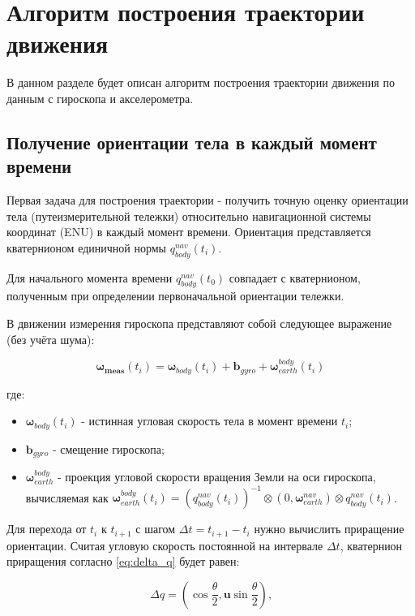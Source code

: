 
\section{Алгоритм построения траектории движения}
\label{sec:trajectory}

В данном разделе будет описан алгоритм построения траектории движения по данным с гироскопа и акселерометра.

\subsection{Получение ориентации тела в каждый момент времени}
Первая задача для построения траектории - получить точную оценку ориентации тела (путеизмерительной тележки) относительно навигационной системы координат (ENU) в каждый момент времени. Ориентация представляется кватернионом единичной нормы $q_{body}^{nav}(t_i)$.

Для начального момента времени $q_{body}^{nav}(t_0)$ совпадает с кватернионом, полученным при определении первоначальной ориентации тележки.

В движении измерения гироскопа представляют собой следующее выражение (без учёта шума):

\begin{equation*}
	\bm{\omega_{meas}}(t_i) = \bm{\omega}_{body}(t_i) + \bm{b}_{gyro} + \bm{\omega}_{earth}^{body}(t_i)
\end{equation*}

где:
\begin{itemize}
	\item $\bm{\omega}_{body}(t_i)$ - истинная угловая скорость тела в момент времени $t_i$;
	\item $\bm{b}_{gyro}$ - смещение гироскопа;
	\item $\bm{\omega}_{earth}^{body}$ - проекция угловой скорости вращения Земли на оси гироскопа, вычисляемая как $\bm{\omega}_{earth}^{body}(t_i) = \left( q_{body}^{nav}(t_i) \right)^{-1} \otimes \left( 0, \bm{\omega}_{earth}^{nav} \right) \otimes q_{body}^{nav}(t_i)$.
\end{itemize}


Для перехода от $t_i$ к $t_{i+1}$ с шагом $\Delta t = t_{i+1} - t_i$ нужно вычислить приращение ориентации. Считая угловую скорость постоянной на интервале $\Delta t$, кватернион приращения согласно \eqref{eq:delta_q} будет равен:

\begin{equation}
	\Delta q = \left(
	\cos \frac{\theta}{2}, \bm{u} \sin \frac{\theta}{2}
	\right) \text{,}
\end{equation}

